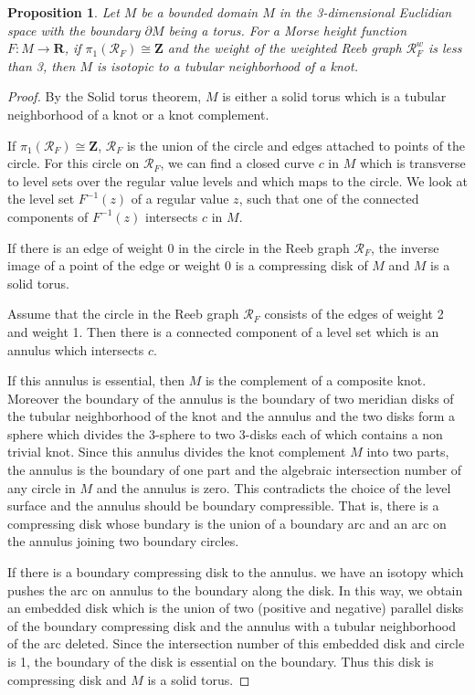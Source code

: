 \documentclass{amsart}
\newtheorem{proposition}[theorem]{Proposition}
\numberwithin{equation}{section}
\newcommand{\RR}{{\boldsymbol{R}}}
\newcommand{\ZZ}{{\boldsymbol{Z}}}
\newcommand{\lra}{\longrightarrow}
\newcommand{\bd}{\partial}
\begin{document}
\begin{proposition}\label{prop:RF_circle}
Let $M$ be a bounded domain $M$ in the 3-dimensional Euclidian space with the boundary $\bd M$ being a torus. For a Morse height function $F:M\lra \RR$, if $\pi_1( \mathcal{R}_{F})\cong \ZZ$ and the weight of the weighted Reeb graph $\mathcal{R}_F^w$ is less than 3, then $M$ is isotopic to a tubular neighborhood of a knot. 
\end{proposition}

\begin{proof}
By the Solid torus theorem, $M$ is either a solid torus which is a tubular neighborhood of a knot or a knot complement.

If $\pi_1( \mathcal{R}_{F})\cong \ZZ$, $\mathcal{R}_F$ is the union of the circle and edges attached to points of the circle. For this circle on $\mathcal{R}_F$, we can find a closed curve $c$ in $M$ which is transverse to level sets over the regular value levels and which maps to the circle. 
We look at the level set $F^{-1}(z)$ of a regular value $z$, such that one of the connected components of $F^{-1}(z)$ intersects $c$ in $M$.

If there is an edge of weight 0 in the circle in the Reeb graph $\mathcal{R}_F$, the inverse image of a point of the edge or weight 0 is a compressing disk of $M$ and $M$ is a solid torus.

Assume that the circle in the Reeb graph $\mathcal{R}_F$
 consists of the edges of weight 2 and weight 1. Then 
there is a connected component of a level set which is an annulus which intersects $c$.

If this annulus is essential, then $M$ is the complement of a composite knot. Moreover the boundary of the annulus is the boundary of two meridian disks of the tubular neighborhood of the knot and the annulus and the two disks form a sphere which divides the 3-sphere to two 3-disks each of which  contains a non trivial knot.
Since this annulus divides the knot complement $M$ into two parts, the annulus is the boundary of one part and the algebraic intersection number of any circle in $M$ and the annulus is zero. This contradicts the choice of the level surface and the annulus should be boundary compressible. 
That is, there is a compressing disk whose bundary is the union of a boundary arc and an arc on the annulus joining two boundary circles.

If there is a boundary compressing disk to the annulus. we have an isotopy which pushes the arc on annulus to the boundary along the disk. In this way, we obtain an embedded disk which is the union of two (positive and negative) parallel disks of the boundary compressing disk and the annulus with a tubular neighborhood of the arc deleted. Since the intersection number of this embedded disk and circle is 1, the boundary of the disk is essential on the boundary. Thus this disk is compressing disk and $M$ is a solid torus.
\end{proof}
\end{document}
